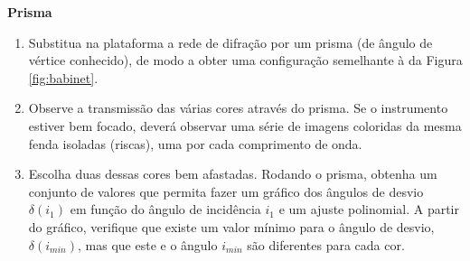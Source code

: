 \documentclass[a4paper,12pt]{article}      %
\begin{document}
\textbf{Prisma}
\begin{enumerate}[resume]
\item Substitua na plataforma a rede de difração por um prisma (de ângulo de vértice conhecido), de modo a obter uma configuração semelhante à da Figura \ref{fig:babinet}.
\item  Observe  a transmissão  das várias cores  através  do  prisma.  Se o instrumento estiver bem focado, deverá  observar  uma  série  de 
imagens coloridas da mesma fenda isoladas (riscas), uma por cada comprimento de onda.
\item Escolha duas dessas cores bem afastadas. Rodando o prisma, obtenha um conjunto de valores que permita fazer um gráfico dos ângulos de desvio $\delta(i_1)$ em função do ângulo de incidência $i_1$ e um ajuste polinomial. A partir do gráfico, verifique que existe um valor mínimo para o ângulo de desvio,  $ \delta(i_{min})$, mas  que este e o ângulo $i_{min}$ são  diferentes para cada cor.
\end{enumerate}


	
\newpage
\def\width{18}
\def\hauteur{25}
\end{document}
